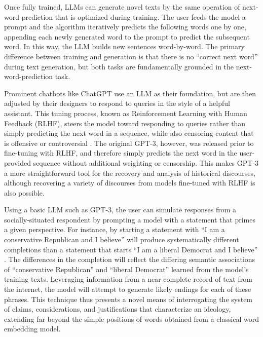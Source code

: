 \documentclass{article}
\begin{document}
Once fully trained, LLMs can generate novel texts by the same operation
of next-word prediction that is optimized during training. The user
feeds the model a prompt and the algorithm iteratively predicts the
following words one by one, appending each newly generated word to the
prompt to predict the subsequent word. In this way, the LLM builds new
sentences word-by-word. The primary difference between training and
generation is that there is no ``correct next word'' during text
generation, but both tasks are fundamentally grounded in the
next-word-prediction task.

Prominent chatbots like ChatGPT use an LLM as their foundation, but are
then adjusted by their designers to respond to queries in the style of a
helpful assistant. This tuning process, known as Reinforcement Learning
with Human Feedback (RLHF), steers the model toward responding to
queries rather than simply predicting the next word in a sequence, while
also censoring content that is offensive or controversial
\parencite{Ouyang2022-xw,}. The
original GPT-3, however, was released prior to fine-tuning with RLHF,
and therefore simply predicts the next word in the user-provided
sequence without additional weighting or censorship. This makes GPT-3 a
more straightforward tool for the recovery and analysis of historical
discourses, although recovering a variety of discourses from models
fine-tuned with RLHF is also possible.

Using a basic LLM such as GPT-3, the user can simulate responses from a
socially-situated respondent by prompting a model with a statement that
primes a given perspective. For instance, by starting a statement with
``I am a conservative Republican and I believe'' will produce
systematically different completions than a statement that starts ``I am
a liberal Democrat and I believe''
\parencite{Argyle2023-ii}. The
differences in the completion will reflect the differing semantic
associations of ``conservative Republican'' and ``liberal Democrat''
learned from the model's training texts. Leveraging information from a
near complete record of text from the internet, the model will attempt
to generate likely endings for each of these phrases. This technique
thus presents a novel means of interrogating the system of claims,
considerations, and justifications that characterize an ideology,
extending far beyond the simple positions of words obtained from a
classical word embedding model.
\end{document}
